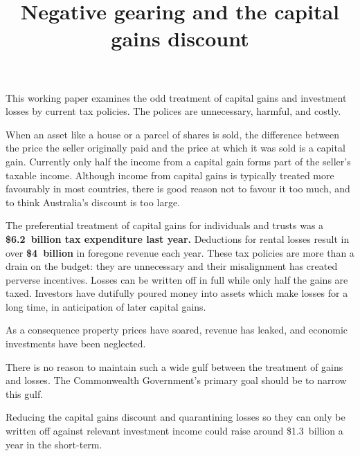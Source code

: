 \documentclass{grattan}\usepackage[]{graphicx}\usepackage[]{color}
\title{Negative gearing and the capital gains discount}
\author{\redsout{John Daley and Danielle Wood}}
\newcommand{\highlight}[1]{\textbf{#1}}
\begin{document}
\clearpage




\raggedbottom















\begin{summary}
This working paper examines the odd treatment of capital gains and investment losses by current tax policies. The polices are unnecessary, harmful, and costly.

When an asset like a house or a parcel of shares is sold, the difference between the price the seller originally paid and the price at which it was sold is a capital gain. Currently only half the income from a capital gain forms part of the seller's taxable income. Although income from capital gains is typically treated more favourably in most countries, there is good reason not to favour it too much, and to think Australia's discount is too large.

The preferential treatment of capital gains for individuals and trusts was a \highlight{\$6.2~billion tax expenditure last year.} Deductions for rental losses result in over \highlight{\$4~billion} in foregone revenue each year. These tax policies are more than a drain on the budget: they are unnecessary and their misalignment has created perverse incentives. Losses can be written off in full while only half the gains are taxed. Investors have dutifully poured money into assets which make losses for a long time, in anticipation of later capital gains.

As a consequence property prices have soared, revenue has leaked, and economic investments have been neglected. 

There is no reason to maintain such a wide gulf between the treatment of gains and losses. The Commonwealth Government's primary goal should be to narrow this gulf.

Reducing the capital gains discount and quarantining losses so they can only be written off against relevant investment income could raise around \$1.3~billion a year in the short-term.
\end{summary}
\end{document}
